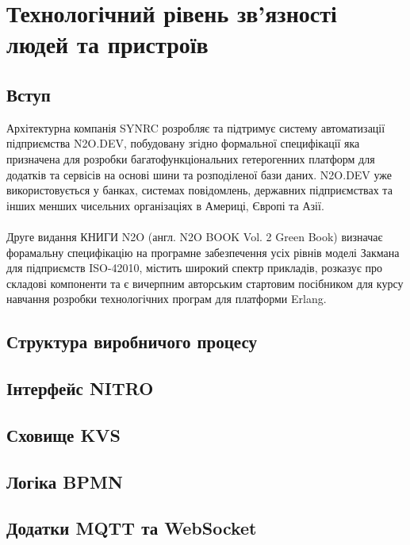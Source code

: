 \chapter{Технологічний рівень зв'язності людей та пристроїв}

\section{Вступ}

Архітектурна компанія SYNRC розробляє та підтримує систему автоматизації підприємства N2O.DEV,
побудовану згідно формальної специфікації яка призначена для розробки багатофункціональних
гетерогенних платформ для додатків та сервісів на основі шини та розподіленої бази даних.
N2O.DEV уже використовується у банках, системах повідомлень, державних підприємствах та
інших менших чисельних організаціях в Америці, Європі та Азії.
\\
\\
Друге видання КНИГИ N2O (англ. N2O BOOK Vol. 2 Green Book) визначає форамальну специфікацію
на програмне забезпечення усіх рівнів моделі Закмана для підприємств ISO-42010, містить
широкий спектр прикладів, розказує про складові компоненти та є вичерпним авторським
стартовим посібником для курсу навчання розробки технологічних програм для платформи Erlang.

\section{Структура виробничого процесу}

\section{Інтерфейс NITRO}

\section{Сховище KVS}

\section{Логіка BPMN}



\section{Додатки MQTT та WebSocket}

